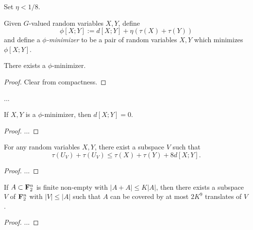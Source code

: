 Set $\eta < 1/8$.

\begin{definition}  Given $G$-valued random variables $X,Y$, define
$$ \phi[X;Y] := d[X;Y] + \eta(\tau(X) + \tau(Y))$$
and define a \emph{$\phi$-minimizer} to be a pair of random variables $X,Y$ which minimizes $\phi[X;Y]$.
\end{definition}

\begin{lemma}\label{phi-min-exist}  There exists a $\phi$-minimizer.
\end{lemma}

\begin{proof} Clear from compactness.
\end{proof}

...

\begin{proposition}  If $X,Y$ is a $\phi$-minimizer, then $d[X;Y] = 0$.
\end{proposition}

\begin{proof}
  ...
\end{proof}


\begin{proposition}  For any random variables $X,Y$, there exist  a subspace $V$ such that
  $$ \tau(U_V) + \tau(U_V) \leq \tau(X) + \tau(Y) + 8 d[X;Y].$$
\end{proposition}

\begin{proof}
  ...
\end{proof}


\begin{theorem}[PFR with $C=9$]  If $A \subset {\bf F}_2^n$ is finite non-empty with $|A+A| \leq K|A|$, then there exists a subspace $V$ of ${\bf F}_2^n$ with $|V| \leq |A|$ such that $A$ can be covered by at most $2K^9$ translates of $V$.
\end{theorem}

\begin{proof}
  ...
\end{proof}
